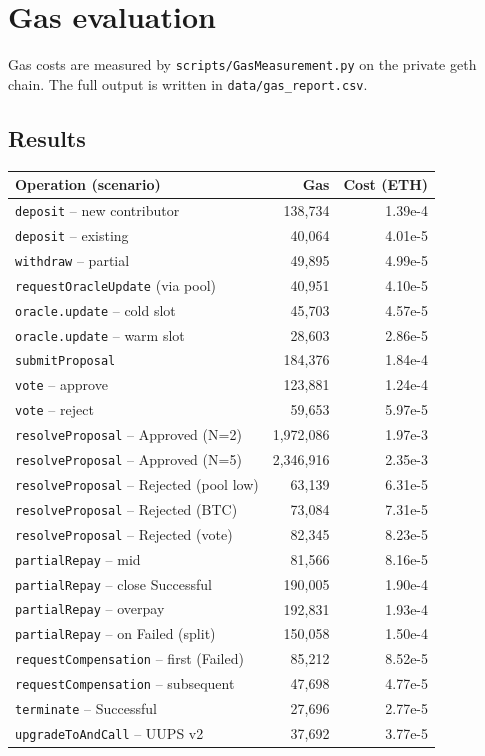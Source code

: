 \documentclass{report}
\begin{document}
\section*{Gas evaluation}
Gas costs are measured by \texttt{scripts/GasMeasurement.py} on the private geth chain. The full output is written in \texttt{data/gas\_report.csv}.

\subsection*{Results}
\begin{center}\small
\begin{tabular}{lrr}
\toprule
Operation (scenario) & Gas & Cost (ETH) \\
\midrule
\texttt{deposit} -- new contributor              & 138,734  & 1.39e-4 \\
\texttt{deposit} -- existing                     &  40,064  & 4.01e-5 \\
\texttt{withdraw} -- partial                     &  49,895  & 4.99e-5 \\
\texttt{requestOracleUpdate} (via pool)          &  40,951  & 4.10e-5 \\
\texttt{oracle.update} -- cold slot              &  45,703  & 4.57e-5 \\
\texttt{oracle.update} -- warm slot              &  28,603  & 2.86e-5 \\
\texttt{submitProposal}                          & 184,376  & 1.84e-4 \\
\texttt{vote} -- approve                         & 123,881  & 1.24e-4 \\
\texttt{vote} -- reject                          &  59,653  & 5.97e-5 \\
\texttt{resolveProposal} -- Approved (N=2)       & 1,972,086 & 1.97e-3 \\
\texttt{resolveProposal} -- Approved (N=5)       & 2,346,916 & 2.35e-3 \\
\texttt{resolveProposal} -- Rejected (pool low)  &  63,139  & 6.31e-5 \\
\texttt{resolveProposal} -- Rejected (BTC)       &  73,084  & 7.31e-5 \\
\texttt{resolveProposal} -- Rejected (vote)      &  82,345  & 8.23e-5 \\
\texttt{partialRepay} -- mid                     &  81,566  & 8.16e-5 \\
\texttt{partialRepay} -- close Successful         & 190,005  & 1.90e-4 \\
\texttt{partialRepay} -- overpay                 & 192,831  & 1.93e-4 \\
\texttt{partialRepay} -- on Failed (split)       & 150,058  & 1.50e-4 \\
\texttt{requestCompensation} -- first (Failed)   &  85,212  & 8.52e-5 \\
\texttt{requestCompensation} -- subsequent        &  47,698  & 4.77e-5 \\
\texttt{terminate} -- Successful                 &  27,696  & 2.77e-5 \\
\texttt{upgradeToAndCall} -- UUPS v2             &  37,692  & 3.77e-5 \\
\bottomrule
\end{tabular}
\end{center}
\end{document}
